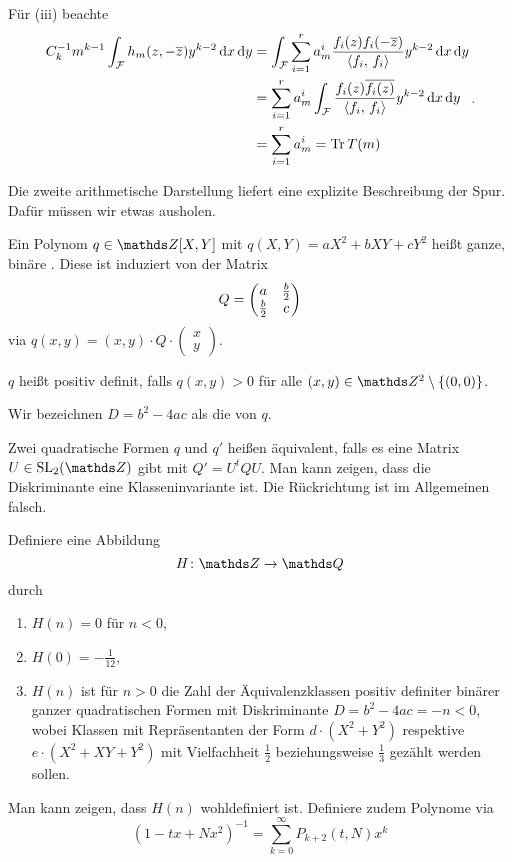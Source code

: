 \begin{bewe}
	Für (iii) beachte
	\[\begin{split}
	C_k^{-1} m^{k-1} \int_\F h_m(z, -\conj{z}) y^{k-2}\opd x \opd y
	&= \int_\F \sum_{i=1}^r a_m^i \frac{f_i(z)f_i(-\conj z)}{\scalarprd{f_i}{f_i}} y^{k-2} \opd x \opd y \\
	&= \sum_{i=1}^r a_m^i\int_\F \frac{f_i(z) \conj{f_i(z)}}{\scalarprd{f_i}{f_i}} y ^{k-2} \opd x \opd y \\
	&= \sum_{i=1}^r a_m^i = \Tr T(m)
	\end{split}
	\,.
	\]
\end{bewe}

Die zweite arithmetische Darstellung liefert eine explizite Beschreibung der Spur.
Dafür müssen wir etwas ausholen.

\begin{defi}
	Ein Polynom $q \in \ZZ[X, Y]$ mit $q(X,Y) = aX^2 + bXY + cY^2$ heißt ganze, binäre .
	Diese ist induziert von der Matrix
	\[
	Q = \mymat*{a}{\frac{b}{2}}{\frac{b}{2}}{c}
	\]
	via $q(x,y) = (x, y) \cdot Q \cdot (\begin{smallmatrix} x \\ y \end{smallmatrix})$.
	
	$q$ heißt positiv definit, falls $q(x,y) > 0$ für alle $(x,y) \in \ZZ^2\setminus\{(0,0)\}$.
	
	Wir bezeichnen $D = b^2 - 4ac$ als die  von $q$.
	
	Zwei quadratische Formen $q$ und $q'$ heißen äquivalent, falls es eine Matrix $U \in \SL_2(\ZZ)$ gibt mit $Q' = U^t Q U$. Man kann zeigen, dass die Diskriminante eine Klasseninvariante ist.
	Die Rückrichtung ist im Allgemeinen falsch.
	
	Definiere eine Abbildung
	\[
	H\colon \ZZ \ra \QQ
	\]
	durch
	\begin{enumerate}
		\item $H(n) = 0$ für $n < 0$,
		\item $H(0) = - \frac{1}{12}$,
		\item $H(n)$ ist für $n > 0$ die Zahl der Äquivalenzklassen positiv definiter binärer ganzer quadratischen Formen mit Diskriminante $D = b^2-4ac = -n < 0$, wobei Klassen mit Repräsentanten der Form $d\cdot (X^2 + Y^2)$ respektive $e \cdot (X^2 + XY + Y^2)$ mit Vielfachheit $\frac{1}{2}$ beziehungsweise $\frac{1}{3}$ gezählt werden sollen.
	\end{enumerate}
	Man kann zeigen, dass $H(n)$ wohldefiniert ist.
	Definiere zudem Polynome via
	\[
	(1-tx+Nx^2)^{-1} = \sum_{k=0}^\infty P_{k+2}(t,N) x^k
	\]
\end{defi}

